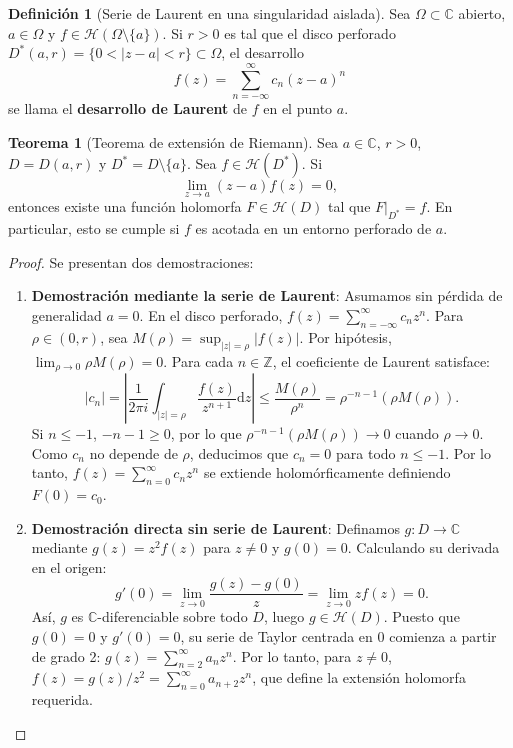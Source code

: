 \documentclass[11pt,a4paper]{article}
\theoremstyle{definition}
\newtheorem{definicion}{Definición}[section]
\newtheorem{teorema}{Teorema}[section]
\theoremstyle{remark}
\numberwithin{equation}{section}
\newcommand{\dz}{\mathrm{d}z}
\begin{document}
\begin{definicion}[Serie de Laurent en una singularidad aislada]
Sea $\Omega \subset \mathbb{C}$ abierto, $a \in \Omega$ y $f \in \mathcal{H}(\Omega \setminus \{a\})$. Si $r > 0$ es tal que el disco perforado $D^*(a,r) = \{0 < |z-a| < r\} \subset \Omega$, el desarrollo
\begin{equation}
f(z) = \sum_{n=-\infty}^\infty c_n (z-a)^n
\end{equation}
se llama el \textbf{desarrollo de Laurent} de $f$ en el punto $a$.
\end{definicion}

\begin{teorema}[Teorema de extensión de Riemann]
Sea $a \in \mathbb{C}$, $r > 0$, $D = D(a,r)$ y $D^* = D \setminus \{a\}$. Sea $f \in \mathcal{H}(D^*)$. Si
\begin{equation}
\lim_{z \to a} (z - a) f(z) = 0,
\end{equation}
entonces existe una función holomorfa $F \in \mathcal{H}(D)$ tal que $F|_{D^*} = f$. En particular, esto se cumple si $f$ es acotada en un entorno perforado de $a$.
\end{teorema}
\begin{proof}
Se presentan dos demostraciones:
\begin{enumerate}
\item \textbf{Demostración mediante la serie de Laurent}:
Asumamos sin pérdida de generalidad $a = 0$. En el disco perforado, $f(z) = \sum_{n=-\infty}^\infty c_n z^n$. Para $\rho \in (0,r)$, sea $M(\rho) = \sup_{|z|=\rho} |f(z)|$. Por hipótesis, $\lim_{\rho \to 0} \rho M(\rho) = 0$. 
Para cada $n \in \mathbb{Z}$, el coeficiente de Laurent satisface:
\[
|c_n| = \left| \frac{1}{2\pi i} \int_{|z|=\rho} \frac{f(z)}{z^{n+1}}\dz \right| \le \frac{M(\rho)}{\rho^n} = \rho^{-n-1} (\rho M(\rho)).
\]
Si $n \le -1$, $-n-1 \ge 0$, por lo que $\rho^{-n-1} (\rho M(\rho)) \to 0$ cuando $\rho \to 0$. Como $c_n$ no depende de $\rho$, deducimos que $c_n = 0$ para todo $n \le -1$. Por lo tanto, $f(z) = \sum_{n=0}^\infty c_n z^n$ se extiende holomórficamente definiendo $F(0) = c_0$.
\item \textbf{Demostración directa sin serie de Laurent}:
Definamos $g: D \to \mathbb{C}$ mediante $g(z) = z^2 f(z)$ para $z \neq 0$ y $g(0) = 0$. Calculando su derivada en el origen:
\[
g'(0) = \lim_{z \to 0} \frac{g(z) - g(0)}{z} = \lim_{z \to 0} z f(z) = 0.
\]
Así, $g$ es $\mathbb{C}$-diferenciable sobre todo $D$, luego $g \in \mathcal{H}(D)$. Puesto que $g(0) = 0$ y $g'(0) = 0$, su serie de Taylor centrada en $0$ comienza a partir de grado 2: $g(z) = \sum_{n=2}^\infty a_n z^n$. Por lo tanto, para $z \neq 0$, $f(z) = g(z)/z^2 = \sum_{n=0}^\infty a_{n+2} z^n$, que define la extensión holomorfa requerida.
\end{enumerate}
\end{proof}
\end{document}
